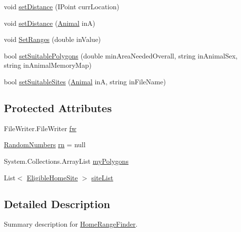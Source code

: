 \begin{DoxyCompactItemize}
\item 
void \hyperlink{class_s_e_a_r_c_h_1_1_home_range_finder_aa8f3a0963d2f66e546597840d9219d89}{set\-Distance} (I\-Point curr\-Location)
\item 
void \hyperlink{class_s_e_a_r_c_h_1_1_home_range_finder_ac4489d478a6b1c80b706de156179b7a5}{set\-Distance} (\hyperlink{class_s_e_a_r_c_h_1_1_animal}{Animal} in\-A)
\item 
void \hyperlink{class_s_e_a_r_c_h_1_1_home_range_finder_a0e5f3941a7fa90911e6ea0c09a7b831b}{Set\-Ranges} (double in\-Value)
\item 
bool \hyperlink{class_s_e_a_r_c_h_1_1_home_range_finder_a62f36c07aadf699d7c10852b1b19d00d}{set\-Suitable\-Polygons} (double min\-Area\-Needed\-Overall, string in\-Animal\-Sex, string in\-Animal\-Memory\-Map)
\item 
bool \hyperlink{class_s_e_a_r_c_h_1_1_home_range_finder_a9ef874a4eb49913a8ce79e47e5eddfaa}{set\-Suitable\-Sites} (\hyperlink{class_s_e_a_r_c_h_1_1_animal}{Animal} in\-A, string in\-File\-Name)
\end{DoxyCompactItemize}
\subsection*{Protected Attributes}
\begin{DoxyCompactItemize}
\item 
File\-Writer.\-File\-Writer \hyperlink{class_s_e_a_r_c_h_1_1_home_range_finder_a7aa6fb5898f942e04a2a68ee52e64eca}{fw}
\item 
\hyperlink{class_s_e_a_r_c_h_1_1_random_numbers}{Random\-Numbers} \hyperlink{class_s_e_a_r_c_h_1_1_home_range_finder_a476c2c25a136fd672fbabde620fc21e7}{rn} = null
\item 
System.\-Collections.\-Array\-List \hyperlink{class_s_e_a_r_c_h_1_1_home_range_finder_a7699b693447c55c2ad1b4a33ed55e6c7}{my\-Polygons}
\item 
List$<$ \hyperlink{class_s_e_a_r_c_h_1_1_eligible_home_site}{Eligible\-Home\-Site} $>$ \hyperlink{class_s_e_a_r_c_h_1_1_home_range_finder_a7020eef24adbc1e3d96a79a91f32a70e}{site\-List}
\end{DoxyCompactItemize}


\subsection{Detailed Description}
Summary description for \hyperlink{class_s_e_a_r_c_h_1_1_home_range_finder}{Home\-Range\-Finder}. 



